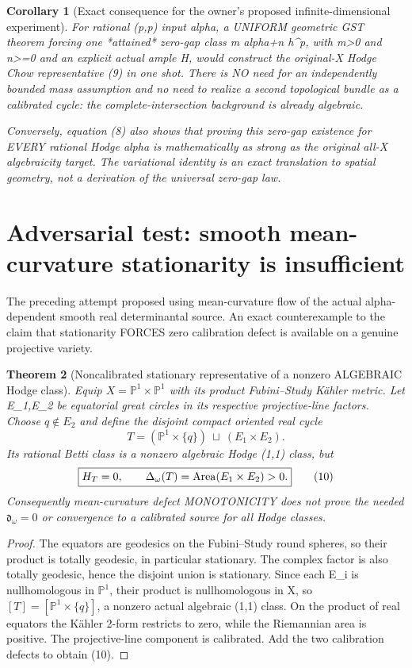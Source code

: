 \documentclass[11pt]{article}
\newtheorem{theorem}{Theorem}[section]
\newtheorem{corollary}[theorem]{Corollary}
\begin{document}
\begin{corollary}[Exact consequence for the owner's proposed infinite-dimensional experiment]
For rational (p,p) input alpha, a
UNIFORM geometric GST theorem forcing
one *attained* zero-gap class
m alpha+n h^p, with m>0 and n>=0
and an explicit actual ample H,
would construct the original-X
Hodge Chow representative (9)
in one shot. There is NO need
for an independently bounded
mass assumption and no need
to realize a second
topological bundle as a
calibrated cycle: the
complete-intersection
background is already algebraic.

Conversely, equation (8)
also shows that proving this
zero-gap existence for EVERY
rational Hodge alpha is
mathematically as strong as
the original all-X
algebraicity target. The
variational identity is
an exact translation to
spatial geometry, not
a derivation of the
universal zero-gap law.
\end{corollary}

\section{Adversarial test: smooth mean-curvature stationarity is insufficient}
The preceding attempt proposed using
mean-curvature flow of the actual
alpha-dependent smooth real
determinantal source.
An exact counterexample to the
claim that stationarity FORCES
zero calibration defect is available
on a genuine projective variety.

\begin{theorem}[Noncalibrated stationary representative of a nonzero ALGEBRAIC Hodge class]
Equip $X=\mathbb P^1\times\mathbb P^1$
with its product Fubini--Study K\"ahler metric.
Let E_1,E_2 be equatorial great circles
in its respective projective-line factors.
Choose $q\notin E_2$ and define the
disjoint compact oriented real cycle
\[
 T=(\mathbb P^1\times\{q\})
       \ \sqcup\ (E_1\times E_2).
\]
Its rational Betti class is a nonzero
algebraic Hodge (1,1) class, but
\[
 \boxed{
 H_T=0,\qquad
 \Delta_\omega(T)=
     {\rm Area}(E_1\times E_2)>0 .
 }                                                       \tag{10}
\]
Consequently mean-curvature defect
MONOTONICITY does not prove
the needed $\mathfrak d_\omega=0$
or convergence to a calibrated
source for all Hodge classes.
\end{theorem}
\begin{proof}
The equators are geodesics on
the Fubini--Study round spheres,
so their product is totally
geodesic, in particular stationary.
The complex factor is also
totally geodesic, hence the
disjoint union is stationary.
Since each E_i is nullhomologous
in $\mathbb P^1$, their product
is nullhomologous in X, so
$[T]=[\mathbb P^1\times\{q\}]$,
a nonzero actual algebraic
(1,1) class. On the product
of real equators the K\"ahler
2-form restricts to zero, while
the Riemannian area is positive.
The projective-line component
is calibrated. Add the two
calibration defects to obtain
(10).
\end{proof}
\end{document}
